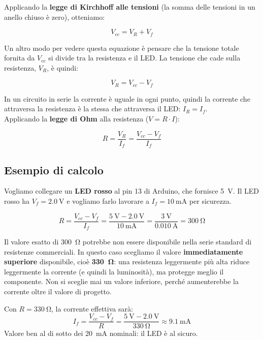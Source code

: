 Applicando la \textbf{legge di Kirchhoff alle tensioni} (la somma delle tensioni in 
un anello chiuso è zero), otteniamo:

\begin{equation}
    V_{cc} = V_R + V_f
\end{equation}

Un altro modo per vedere questa equazione è pensare che la tensione totale fornita da $V_{cc}$ si divide tra la resistenza e il LED. La tensione che cade sulla resistenza, $V_R$, è quindi:

\begin{equation}
    V_R = V_{cc} - V_f
\end{equation}

In un circuito in serie la corrente è uguale in ogni punto, quindi la corrente che attraversa la resistenza è la stessa che attraversa il LED: $I_R = I_f$.\\
Applicando la \textbf{legge di Ohm} alla resistenza ($V = R \cdot I$):

\begin{equation}
    R = \frac{V_R}{I_f} = \frac{V_{cc} - V_f}{I_f}
\end{equation}

\subsection*{Esempio di calcolo}

Vogliamo collegare un \textbf{LED rosso} al pin 13 di Arduino, che fornisce 
\SI{5}{\volt}. Il LED rosso ha $V_f = \SI{2.0}{\volt}$ e vogliamo farlo 
lavorare a $I_f = \SI{10}{\milli\ampere}$ per sicurezza.

\begin{equation}
    R = \frac{V_{cc} - V_f}{I_f} = \frac{\SI{5}{\volt} - \SI{2.0}{\volt}}{\SI{10}{\milli\ampere}} = \frac{\SI{3}{\volt}}{\SI{0.010}{\ampere}} = \SI{300}{\ohm}
\end{equation}

Il valore esatto di \SI{300}{\ohm} potrebbe non essere disponibile nella serie 
standard di resistenze commerciali. In questo caso scegliamo il valore 
\textbf{immediatamente superiore} disponibile, cioè \textbf{\SI{330}{\ohm}}: 
una resistenza leggermente più alta riduce leggermente la corrente (e quindi la 
luminosità), ma protegge meglio il componente. Non si sceglie mai un valore 
inferiore, perché aumenterebbe la corrente oltre il valore di progetto.

\begin{tcolorbox}[colback=olive!4, colframe=olive!60, title=\textbf{Verifica del calcolo}]
    Con $R = \SI{330}{\ohm}$, la corrente effettiva sarà:
    \[
        I_f = \frac{V_{cc} - V_f}{R} = \frac{\SI{5}{\volt} - \SI{2.0}{\volt}}{\SI{330}{\ohm}} \approx \SI{9.1}{\milli\ampere}
    \]
    Valore ben al di sotto dei \SI{20}{\milli\ampere} nominali: il LED è al sicuro.
\end{tcolorbox}

